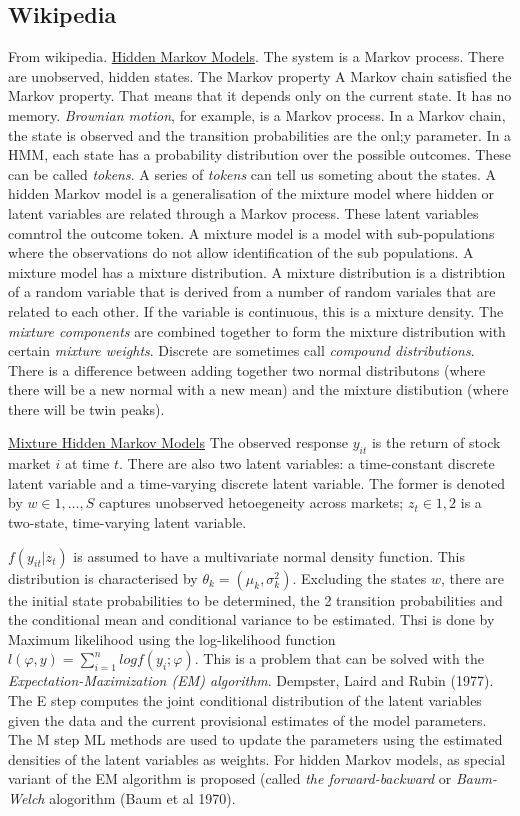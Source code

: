 \documentclass[12pt, a4paper, oneside]{article} %
\begin{document}
\subsection{Wikipedia}
From wikipedia.  \href{http://en.wikipedia.org/wiki/Hidden_Markov_model}{Hidden Markov Models}.  The system is a Markov process.  There are unobserved, hidden states.  The Markov property A Markov chain satisfied the Markov property.  That means that it depends only on the current state.  It has no memory. \emph{Brownian motion}, for example, is a Markov process. In a Markov chain, the state is observed and the transition probabilities are the onl;y parameter.  In a HMM, each state has a probability distribution over the possible outcomes.  These can be called \emph{tokens}.  A series of \emph{tokens} can tell us someting about the states.   A hidden Markov model is a generalisation of the mixture model where hidden or latent variables are related through a Markov process. These latent variables comntrol the outcome token. A mixture model is a model with sub-populations where the observations do not allow identification of the sub populations.  A mixture model has a mixture distribution. A mixture distribution is a distribtion of a random variable that is derived from a number of random variales that are related to each other. If the variable is continuous, this is a mixture density.  The \emph{mixture components} are combined together to form the mixture distribution with certain \emph{mixture weights}.  Discrete are sometimes call \emph{compound distributions}.  There is a difference between adding together two normal distributons (where there will be a new normal with a new mean) and the mixture distibution (where there will be twin peaks).  

\href{http://members.home.nl/jeroenvermunt/dias2010.pdf}{Mixture Hidden Markov Models}  The observed response $y_{it}$ is the return of stock market $i$ at time $t$.  There are also two latent variables:  a time-constant discrete latent variable and a time-varying discrete latent variable.  The former is denoted by $w \in {1, \dots, S}$ captures unobserved hetoegeneity across markets; $z_t \in {1,2}$ is a two-state, time-varying latent variable. 

$f(y_{it}|z_t)$ is assumed to have a multivariate normal density function. This distribution is characterised by $\theta_k = (\mu_k, \sigma_k^2)$.  Excluding the states $w$, there are the initial state probabilities to be determined, the 2 transition probabilities and the conditional mean and conditional variance to be estimated.  Thsi is done by Maximum likelihood using the log-likelihood function $l(\varphi, y) = \sum_{i=1}^n log f(y_i; \varphi)$. This is a problem that can be solved with the \emph{Expectation-Maximization (EM) algorithm}.  Dempster, Laird and Rubin (1977).  The E step computes the joint conditional distribution of the latent variables given the data and the current provisional estimates of the model parameters. The M step ML methods are used to update the parameters using the estimated densities of the latent variables as weights. For hidden Markov models, as special variant of the EM algorithm is proposed (called \emph{the forward-backward} or \emph{Baum-Welch} alogorithm (Baum et al 1970).   
\end{document}
